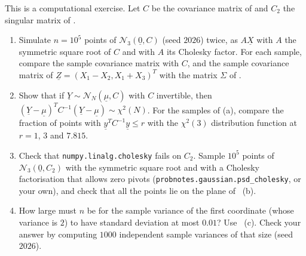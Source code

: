 \begin{exercise}\label{ex:gv-sampling}
\medium This is a computational exercise. Let $C$ be the covariance matrix of
 and $C_2$ the singular matrix of .
\begin{enumerate}[label=(\alph*)]
  \item Simulate $n=10^5$ points of $\mathcal N_3(\underline 0,C)$ (seed $2026$) twice, as
    $A\underline X$ with $A$ the symmetric square root of $C$ and with $A$ its Cholesky factor. For
    each sample, compare the sample covariance matrix with $C$, and the sample covariance matrix of
    $\underline Z=(X_1-X_2,X_1+X_3)^T$ with the matrix $\Sigma$ of .
  \item Show that if $\underline Y\sim\mathcal N_N(\underline\mu,C)$ with $C$ invertible, then
    $(\underline Y-\underline\mu)^TC^{-1}(\underline Y-\underline\mu)\sim\chi^2(N)$. For the samples of
    (a), compare the fraction of points with $\underline y^TC^{-1}\underline y\le r$ with the
    $\chi^2(3)$ distribution function at $r=1$, $3$ and $7.815$.
  \item Check that \texttt{numpy.linalg.cholesky} fails on $C_2$. Sample $10^5$ points of
    $\mathcal N_3(\underline 0,C_2)$ with the symmetric square root and with a Cholesky
    factorisation that allows zero pivots (\texttt{probnotes.gaussian.psd\_cholesky}, or your own),
    and check that all the points lie on the plane of ~(b).
  \item How large must $n$ be for the sample variance of the first coordinate (whose variance is
    $2$) to have standard deviation at most $0.01$? Use ~(c). Check your
    answer by computing $1000$ independent sample variances of that size (seed $2026$).
\end{enumerate}
\end{exercise}

